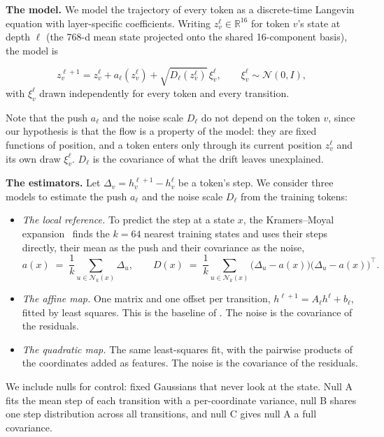 \documentclass[mlmain]{jmlr}
\begin{document}
\textbf{The model.} We model the trajectory of every token as a discrete-time Langevin equation with layer-specific coefficients. 
Writing $z^\ell_v \in \mathbb{R}^{16}$ for token $v$'s state at depth $\ell$ 
(the 768-d mean state projected onto the shared 16-component basis), the model is

\[ z^{\ell+1}_v = z^\ell_v + a_\ell(z^\ell_v) + \sqrt{D_\ell(z^\ell_v)}\,\xi^\ell_v, \qquad \xi^\ell_v \sim \mathcal{N}(0, I), \]
with $\xi^\ell_v$ drawn independently for every token and every
transition.

Note that the push $a_\ell$ and the noise scale $D_\ell$ do not depend
on the token $v$, since our hypothesis is that the flow is a property of
the model: they are fixed functions of position, and a token enters only
through its current position $z^\ell_v$ and its own draw $\xi^\ell_v$.
$D_\ell$ is the covariance of what the drift leaves unexplained.




\textbf{The estimators.} Let
$\Delta_v = h^{\ell+1}_v - h^\ell_v$ be a token's step. We consider three models to
estimate the push $a_\ell$ and the noise scale $D_\ell$ from the training tokens:
\begin{itemize}
\item \emph{The local reference.} To predict the step at a state $x$,
  the Kramers--Moyal expansion~\citep{friedrich2011approaching} finds
  the $k = 64$ nearest training states and uses their steps directly,
  their mean as the push and their covariance as the noise,
  \[
    a(x) \;=\; \frac{1}{k}\!\!\sum_{u \in \mathcal{N}_k(x)}\!\! \Delta_u ,
    \qquad
    D(x) \;=\; \frac{1}{k}\!\!\sum_{u \in \mathcal{N}_k(x)}\!\!
    \big(\Delta_u - a(x)\big)\big(\Delta_u - a(x)\big)^{\!\top} .
  \]
 
\item \emph{The affine map.} One matrix and one offset per transition,
  $h^{\ell+1} = A_\ell h^\ell + b_\ell$, fitted by least squares. This
  is the baseline of \citet{yomdin2024jump}. The noise is the covariance of the residuals.
\item \emph{The quadratic map.} The same least-squares fit, with the
pairwise products of the coordinates added as features. The noise is the covariance of the residuals.
\end{itemize}

We include nulls for control: fixed Gaussians that never look at
the state. Null A fits the mean step of each transition with a
per-coordinate variance, null B shares one step distribution across all
transitions, and null C gives null A a full covariance.
\end{document}
